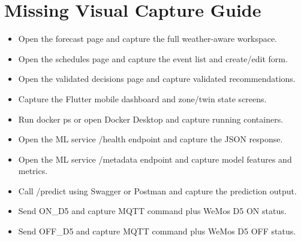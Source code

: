 \chapter{Missing Visual Capture Guide}

\begin{itemize}

\item Open the forecast page and capture the full weather-aware workspace.

\item Open the schedules page and capture the event list and create/edit form.

\item Open the validated decisions page and capture validated recommendations.

\item Capture the Flutter mobile dashboard and zone/twin state screens.

\item Run docker ps or open Docker Desktop and capture running containers.

\item Open the ML service /health endpoint and capture the JSON response.

\item Open the ML service /metadata endpoint and capture model features and metrics.

\item Call /predict using Swagger or Postman and capture the prediction output.

\item Send ON\_D5 and capture MQTT command plus WeMos D5 ON status.

\item Send OFF\_D5 and capture MQTT command plus WeMos D5 OFF status.

\end{itemize}
